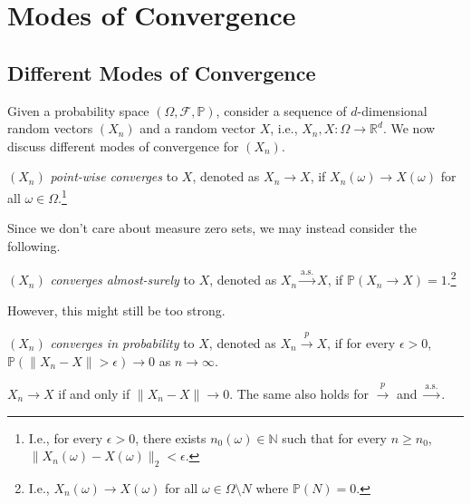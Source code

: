 \chapter{Modes of Convergence}
\section{Different Modes of Convergence}
Given a probability space \((\Omega , \mathscr{F} , \mathbb{P} )\), consider a sequence of \(d\)-dimensional random vectors \((X_n)\) and a random vector \(X\), i.e., \(X_n , X\colon \Omega \to \mathbb{R} ^d\). We now discuss different modes of convergence for \((X_n)\).

\begin{definition}\label{def:point-wise-converge}
	\((X_n)\) \emph{point-wise converges} to \(X\), denoted as \(X_n \to X\), if \(X_n(\omega ) \to X(\omega )\) for all \(\omega \in \Omega \).\footnote{I.e., for every \(\epsilon > 0\), there exists \(n_0(\omega ) \in \mathbb{N} \) such that for every \(n \geq n_0\), \(\lVert X_n(\omega ) - X(\omega ) \rVert _2 < \epsilon \).}
\end{definition}

Since we don't care about measure zero sets, we may instead consider the following.

\begin{definition}\label{def:converge-almost-surely}
	\((X_n)\) \emph{converges almost-surely} to \(X\), denoted as \(X_n \overset{\text{a.s.}}{\to } X\), if \(\mathbb{P} (X_n \to X) = 1\).\footnote{I.e., \(X_n(\omega ) \to X(\omega )\) for all \(\omega \in \Omega \setminus N\) where \(\mathbb{P} (N) = 0\).}
\end{definition}

However, this might still be too strong.

\begin{definition}\label{def:converge-in-probability}
	\((X_n)\) \emph{converges in probability} to \(X\), denoted as \(X_n \overset{p}{\to } X\), if for every \(\epsilon > 0\), \(\mathbb{P} (\lVert X_n - X \rVert > \epsilon ) \to 0\) as \(n \to \infty \).
\end{definition}

\begin{remark}
	\(X_n \to X\) if and only if \(\lVert X_n - X \rVert \to 0\). The same also holds for \(\overset{p}{\to } \) and \(\overset{\text{a.s.} }{\to } \).
\end{remark}

